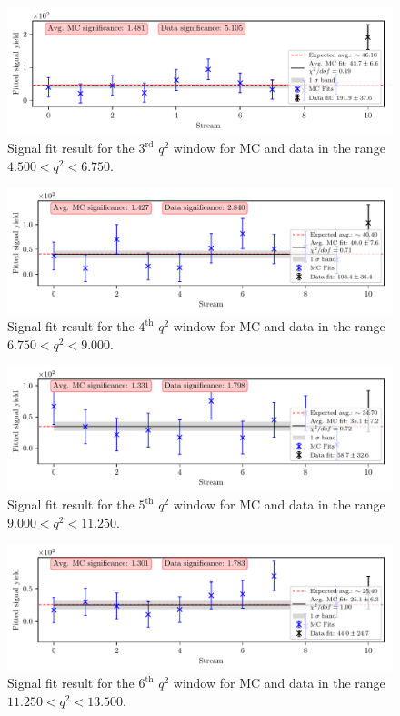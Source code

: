 \begin{figure}[H]
	\centering
	\captionsetup{width=0.8\linewidth}
	\includegraphics[width=\linewidth]{fig/sig_q2_3}
	\caption{Signal fit result for the $3^{\mathrm{rd}}$ $q^2$ window for MC and data in the range $4.500  < q^2 < 6.750$.}
\end{figure}

\begin{figure}[H]
	\centering
	\captionsetup{width=0.8\linewidth}
	\includegraphics[width=\linewidth]{fig/sig_q2_4}
	\caption{Signal fit result for the $4^{\mathrm{th}}$ $q^2$ window for MC and data in the range $6.750  < q^2 < 9.000$.}
\end{figure}

\begin{figure}[H]
	\centering
	\captionsetup{width=0.8\linewidth}
	\includegraphics[width=\linewidth]{fig/sig_q2_5}
	\caption{Signal fit result for the $5^{\mathrm{th}}$ $q^2$ window for MC and data in the range $9.000  < q^2 < 11.250$.}
\end{figure}

\begin{figure}[H]
	\centering
	\captionsetup{width=0.8\linewidth}
	\includegraphics[width=\linewidth]{fig/sig_q2_6}
	\caption{Signal fit result for the $6^{\mathrm{th}}$ $q^2$ window for MC and data in the range $11.250  < q^2 < 13.500$.}
\end{figure}

